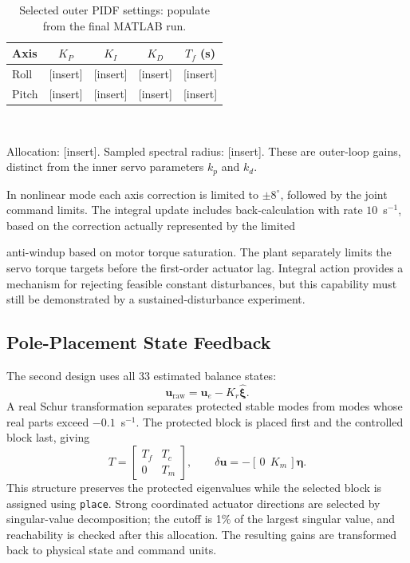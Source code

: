\documentclass[conference,a4paper]{IEEEtran}
\begin{document}
\begin{table}[!htbp]\centering\small
\caption{Selected outer PIDF settings: populate from the final MATLAB run.}
\label{tab:pid_gains_draft}
\begin{tabular}{lcccc}\hline
Axis & $K_P$ & $K_I$ & $K_D$ & $T_f$ (s)\\\hline
Roll & [insert] & [insert] & [insert] & [insert]\\
Pitch & [insert] & [insert] & [insert] & [insert]\\\hline
\end{tabular}\\[3pt]
\parbox{0.96\columnwidth}{\footnotesize Allocation: [insert]. Sampled spectral
radius: [insert]. These are outer-loop gains, distinct from the inner servo
parameters $k_p$ and $k_d$.}
\end{table}

In nonlinear mode each axis correction is limited to $\pm8^\circ$, followed by
the joint command limits. The integral update includes back-calculation with
rate $10$~s$^{-1}$, based on the correction actually represented by the limited

anti-windup based on motor torque saturation. The plant separately limits the
servo torque targets before the first-order actuator lag. Integral action
provides a mechanism for rejecting feasible constant disturbances, but this
capability must still be demonstrated by a sustained-disturbance experiment.

\subsection{Pole-Placement State Feedback}
The second design uses all 33 estimated balance states:
\begin{equation}
 \mathbf u_{\mathrm{raw}}=\mathbf u_e-K_r\hat{\boldsymbol\xi}.
\end{equation}
A real Schur transformation separates protected stable modes from modes whose
real parts exceed $-0.1$~s$^{-1}$. The protected block is placed first and the
controlled block last, giving
\begin{equation}
 T=\begin{bmatrix}T_f&T_c\\0&T_m\end{bmatrix},
 \qquad \delta\mathbf u=-[\,0\ \ K_m\,]\boldsymbol\eta.
\end{equation}
This structure preserves the protected eigenvalues while the selected block
is assigned using \texttt{place}. Strong coordinated actuator directions are
selected by singular-value decomposition; the cutoff is 1\% of the largest
singular value, and reachability is checked after this allocation. The
resulting gains are transformed back to physical state and command units.
\end{document}
